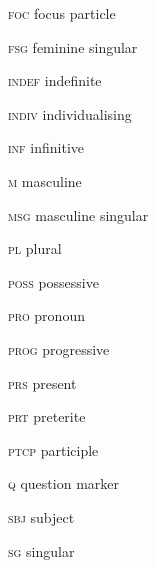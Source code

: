 \documentclass[output=paper]{langsci/langscibook}
\begin{document}
\textsc{foc}  focus particle

\textsc{fsg}  feminine singular

\textsc{indef}  indefinite

\textsc{indiv}  individualising

\textsc{inf  }infinitive

\textsc{m}  masculine

\textsc{msg}  masculine singular

\textsc{pl}  plural

\textsc{poss}  possessive

\textsc{pro}  pronoun

\textsc{prog}  progressive

\textsc{prs}  present

\textsc{prt}  preterite

\textsc{ptcp  }participle

\textsc{q  }question marker

\textsc{sbj}  subject

\textsc{sg}  singular
 
 

\printbibliography[heading=subbibliography,notkeyword=this]
\end{document}
